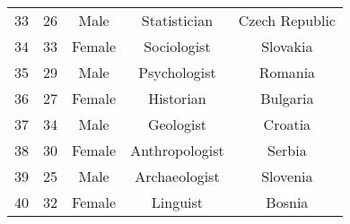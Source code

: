 \begin{longtable}{ccccc}
    33 & 26 & Male & Statistician & Czech Republic \\
    34 & 33 & Female & Sociologist & Slovakia \\
    35 & 29 & Male & Psychologist & Romania \\
    36 & 27 & Female & Historian & Bulgaria \\
    37 & 34 & Male & Geologist & Croatia \\
    38 & 30 & Female & Anthropologist & Serbia \\
    39 & 25 & Male & Archaeologist & Slovenia \\
    40 & 32 & Female & Linguist & Bosnia \\
\end{longtable}
